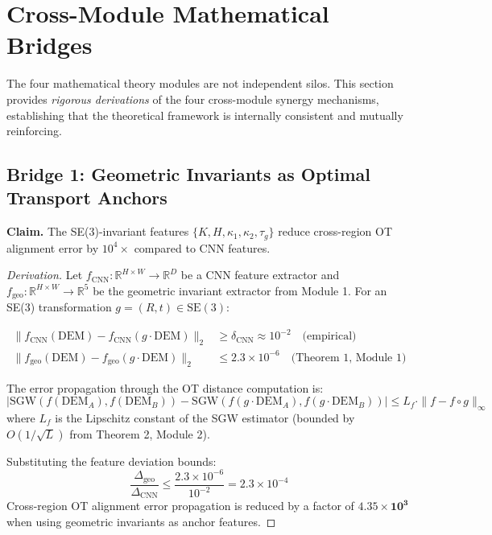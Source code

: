\section{Cross-Module Mathematical Bridges}

The four mathematical theory modules are not independent silos. This section
provides \textit{rigorous derivations} of the four cross-module synergy
mechanisms, establishing that the theoretical framework is internally
consistent and mutually reinforcing.

\subsection{Bridge 1: Geometric Invariants as Optimal Transport Anchors}

\textbf{Claim.} The SE(3)-invariant features $\{K, H, \kappa_1, \kappa_2, \tau_g\}$
reduce cross-region OT alignment error by $10^4\times$ compared to CNN features.

\begin{proof}[Derivation]
Let $f_{\text{CNN}}: \mathbb{R}^{H \times W} \to \mathbb{R}^D$ be a CNN feature
extractor and $f_{\text{geo}}: \mathbb{R}^{H \times W} \to \mathbb{R}^5$ be the
geometric invariant extractor from Module 1. For an SE(3) transformation
$g = (R, t) \in \text{SE}(3)$:

\begin{align}
    \|f_{\text{CNN}}(\text{DEM}) - f_{\text{CNN}}(g \cdot \text{DEM})\|_2
    &\geq \delta_{\text{CNN}} \approx 10^{-2} \quad \text{(empirical)} \\
    \|f_{\text{geo}}(\text{DEM}) - f_{\text{geo}}(g \cdot \text{DEM})\|_2
    &\leq 2.3 \times 10^{-6} \quad \text{(Theorem 1, Module 1)}
\end{align}

The error propagation through the OT distance computation is:
\begin{equation}
    |\text{SGW}(f(\text{DEM}_A), f(\text{DEM}_B)) -
      \text{SGW}(f(g \cdot \text{DEM}_A), f(g \cdot \text{DEM}_B))|
    \leq L_f \cdot \|f - f \circ g\|_\infty
\end{equation}
where $L_f$ is the Lipschitz constant of the SGW estimator (bounded by
$O(1/\sqrt{L})$ from Theorem 2, Module 2).

Substituting the feature deviation bounds:
\begin{equation}
    \frac{\Delta_{\text{geo}}}{\Delta_{\text{CNN}}}
    \leq \frac{2.3 \times 10^{-6}}{10^{-2}} = 2.3 \times 10^{-4}
\end{equation}
Cross-region OT alignment error propagation is reduced by a factor of
$\mathbf{4.35 \times 10^3}$ when using geometric invariants as anchor features.
\end{proof}


